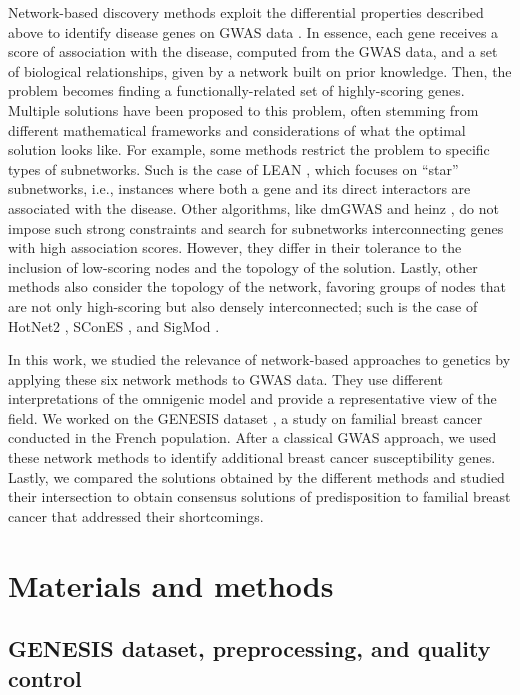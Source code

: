 \documentclass[10pt,letterpaper]{article}
\begin{document}
Network-based discovery methods exploit the differential properties described above to identify disease genes on GWAS data \cite{azencott_network-guided_2016,huang_systematic_2018}. In essence, each gene receives a score of association with the disease, computed from the GWAS data, and a set of biological relationships, given by a network built on prior knowledge. Then, the problem becomes finding a functionally-related set of highly-scoring genes. Multiple solutions have been proposed to this problem, often stemming from different mathematical frameworks and considerations of what the optimal solution looks like. For example, some methods restrict the problem to specific types of subnetworks. Such is the case of LEAN \cite{gwinner_network-based_2016}, which focuses on ``star'' subnetworks, i.e., instances where both a gene and its direct interactors are associated with the disease. Other algorithms, like dmGWAS \cite{jia_dmgwas:_2011} and heinz \cite{dittrich_identifying_2008}, do not impose such strong constraints and search for subnetworks interconnecting genes with high association scores. However, they differ in their tolerance to the inclusion of low-scoring nodes and the topology of the solution. Lastly, other methods also consider the topology of the network, favoring groups of nodes that are not only high-scoring but also densely interconnected; such is the case of HotNet2 \cite{leiserson_pan-cancer_2015}, SConES \cite{azencott_efficient_2013}, and SigMod \cite{liu_sigmod:_2017}.

In this work, we studied the relevance of network-based approaches to genetics by applying these six network methods to GWAS data. They use different interpretations of the omnigenic model and provide a representative view of the field. We worked on the GENESIS dataset \cite{sinilnikova_genesis:_2016}, a study on familial breast cancer conducted in the French population. After a classical GWAS approach, we used these network methods to identify additional breast cancer susceptibility genes. Lastly, we compared the solutions obtained by the different methods and studied their intersection to obtain consensus solutions of predisposition to familial breast cancer that addressed their shortcomings. 

\section{Materials and methods}

\subsection{GENESIS dataset, preprocessing, and quality control}
\label{methods:data}
\end{document}
